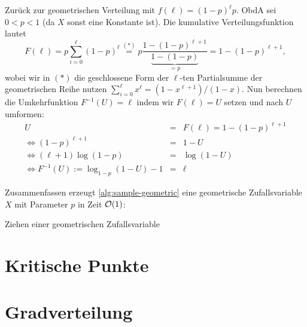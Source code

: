 Zurück zur geometrischen Verteilung mit $f(\ell) = (1-p)^\ell p$.
ObdA sei $0 < p < 1$ (da $X$ sonst eine Konstante ist).
Die kumulative Verteilungsfunktion lautet
\begin{equation}
    F(\ell) = p \sum_{i=0}^\ell (1-p)^\ell \stackrel{(*)}{=} p \frac{1 - (1-p)^{\ell+1}}{\underbrace{1 - (1-p)}_{=p}} = 1 - (1-p)^{\ell+1},
\end{equation}
wobei wir in $(*)$ die geschlossene Form der $\ell$-ten Partialsumme der geometrischen Reihe nutzen $\sum_{i=0}^\ell x^\ell = (1 - x^{\ell+1})/(1 - x)$.
Nun berechnen die Umkehrfunktion $F^{-1}(U) = \ell$ indem wir $F(\ell) = U$ setzen und nach $U$ umformen:
\begin{eqnarray}
    U &=& F(\ell) = 1 - (1-p)^{\ell+1} \\
    \Leftrightarrow (1-p)^{\ell+1} &=& 1 - U \\
    \Leftrightarrow  (\ell+1) \log(1-p)  &=& \log(1 - U) \\
    \Leftrightarrow  F^{-1}(U) := \log_{1-p}(1 - U) - 1 &=& \ell
\end{eqnarray}

\noindent
Zusammenfassen erzeugt \cref{alg:sample-geometric} eine geometrische Zufallsvariable $X$ mit Parameter $p$ in Zeit $\mathcal{O}\!\left(1\right)$:
\begin{algorithm}
    \Else{$U \gets \text{ziehen uniform aus $[0, 1)$}$\;
    Gebe $\log_{1-p}(1 - U) - 1$ zurück.}
    \caption{Ziehen einer geometrischen Zufallsvariable}
    \label{alg:sample-geometric}
\end{algorithm}

\section{Kritische Punkte}


\section{Gradverteilung}
